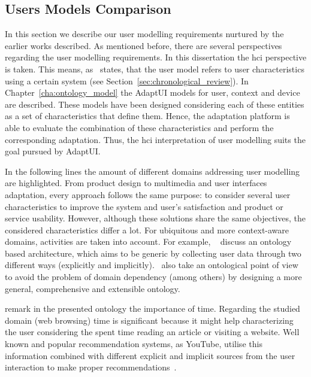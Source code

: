 
\subsection{Users Models Comparison}
\label{sec:user_model_comparison}

In this section we describe our user modelling requirements nurtured by the 
earlier works described. As mentioned before, there are several perspectives 
regarding the user modelling requirements. In this dissertation the \ac{hci} 
perspective is taken. This means, as~\citet{pohl_logic_based_1999} states, 
that the user model refers to user characteristics using a certain system (see 
Section~\ref{sec:chronological_review}). In Chapter~\ref{cha:ontology_model}
the AdaptUI models for user, context and device are described. These models
have been designed considering each of these entities as a set of characteristics
that define them. Hence, the adaptation platform is able to evaluate the
combination of these characteristics and perform the corresponding adaptation.
Thus, the \ac{hci} interpretation of user modelling suits the goal pursued
by AdaptUI.


In the following lines the amount of different domains addressing user modelling 
are highlighted. From product design to multimedia and user interfaces adaptation, 
every approach follows the same purpose: to consider several user characteristics 
to improve the system and user's satisfaction and product or service usability. 
However, although these solutions share the same objectives, the considered 
characteristics differ a lot. For ubiquitous and more context-aware domains, 
activities are taken into account. For example,
~\citet{razmerita_ontology_based_2003} discuss an ontology based architecture, 
which aims to be generic by collecting user data through two different ways 
(explicitly and implicitly).~\citet{golemati_creating_2007} also take an 
ontological point of view to avoid the problem of domain dependency (among 
others) by designing a more general, comprehensive and extensible ontology. 

\citet{gauch_ontology_based_2003} remark in the presented ontology the 
importance of time. Regarding the studied domain (web browsing) time is 
significant because it might help characterizing the user considering the spent 
time reading an article or visiting a website. Well known and popular 
recommendation systems, as YouTube, utilise this information combined with 
different explicit and implicit sources from the user interaction to make proper
recommendations~\citep{davidson_youtube_2010}.

